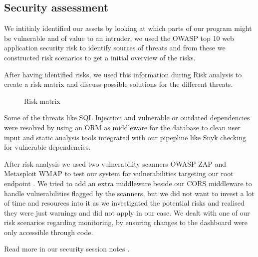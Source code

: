 \subsection{Security assessment}
We intitialy identified our assets by looking at which parts of our program might be vulnerable and of value to an intruder, 
we used the OWASP top 10 web application security risk \cite{owasp-top-10} to identify sources of threats and from these we constructed risk scenarios to get a initial overview of the risks.

After having identified risks, we used this information during Risk analysis to create a risk matrix and discuss possible solutions for the different threats. 


\begin{wrapfigure}{R}{0.38\paperwidth}
    \hspace*{0.35in}
    \caption{Risk matrix}
    \label{fig:Risk-matrix}
\end{wrapfigure}

Some of the threats like SQL Injection and vulnerable or outdated dependencies were resolved by using an ORM \cite{gorm} as middleware for the database to clean user input and static analysis tools integrated with our pipepline like Snyk \cite{snyk} checking for vulnerable dependencies.

After risk analysis we used two vulnerability scanners OWASP ZAP \cite{owasp-zap} and Metasploit \cite{metasploit} WMAP \cite{metasploit-wmap} to test our system for vulnerabilities targeting our root endpoint \cite{minitwit-root-endpoint}.
We tried to add an extra middleware beside our CORS middleware to handle vulnerabilities flagged by the scanners, but we did not want to invest a lot of time and resources into it as we investigated the potential risks and realised they were just warnings and did not apply in our case.
We dealt with one of our risk scenarios regarding monitoring, by ensuring changes to the dashboard were only accessible through code.

Read more in our security session notes \cite{repo:security-session-notes}.
